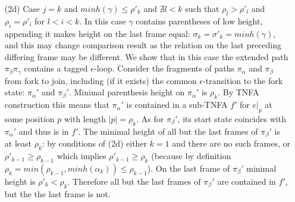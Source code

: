\documentclass[AMA,STIX1COL]{WileyNJD-v2}
\begin{document}
\begin{proofEnd}
\begin{itemize}[itemsep=0.5em, topsep=0.5em]
\begin{itemize}
        \item[(2d)]
            Case $j = k$ %
            and $minh (\gamma) \leq \rho'_k$
            and $\nexists l < k$ such that $\rho_l > \rho'_l$ and $\rho_i = \rho'_i$ for $l < i < k$.
            In this case $\gamma$ contains parentheses of low height,
            appending it makes height on the last frame equal:
            $\sigma_k = \sigma'_k = minh (\gamma)$,
            and this may change comparison result
            as the relation on the last preceding differing frame may be different.
            We show that in this case the extended path $\pi_\beta \pi_\gamma$ contains a tagged $\epsilon$-loop.
            Consider the fragments of paths $\pi_\alpha$ and $\pi_\beta$ from fork to join,
            including (if it exists) the common $\epsilon$-transition to the fork state:
            $\pi_\alpha'$ and $\pi_\beta'$.
            Minimal parenthesis height on $\pi_\alpha'$ is $\rho_k$. %
            By TNFA construction this means that $\pi_\alpha'$ is contained
            in a sub-TNFA $f'$ for $e|_p$ at some position $p$ with length $|p| = \rho_k$.
            As for $\pi_\beta'$, its start state coincides with $\pi_\alpha'$ and thus is in $f'$.
            The minimal height of all but the last frames of $\pi_\beta'$ is at least $\rho_k$:
            by conditions of (2d) either $k = 1$ and there are no such frames,
            or $\rho'_{k-1} \geq \rho_{k-1}$ which implies $\rho'_{k-1} \geq \rho_k$
            (because by definition $\rho_k = min(\rho_{k-1}, minh(\alpha_k)) \leq \rho_{k-1}$).
            On the last frame of $\pi_\beta'$ minimal height is $\rho'_k < \rho_k$.
            Therefore all but the last frames of $\pi_\beta'$ are contained in $f'$,
            but the the last frame is not.

\end{itemize}
\end{itemize}
\end{proofEnd}
\end{document}
